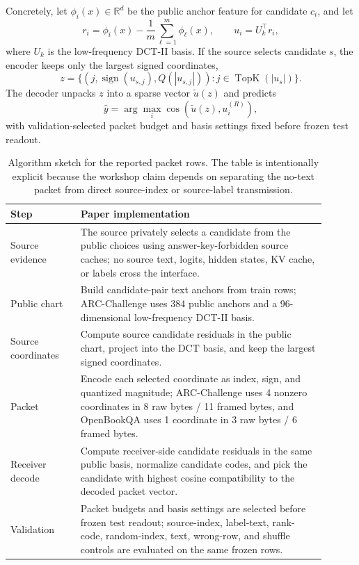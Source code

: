 \documentclass{article}
\newcommand{\arc}{ARC-Challenge}
\newcommand{\obqa}{OpenBookQA}
\begin{document}
Concretely, let $\phi_i(x)\in\mathbb{R}^{d}$ be the public anchor feature for candidate $c_i$, and let
\[
r_i=\phi_i(x)-\frac{1}{m}\sum_{\ell=1}^{m}\phi_\ell(x), \qquad u_i = U_k^\top r_i ,
\]
where $U_k$ is the low-frequency DCT-II basis. If the source selects candidate $s$, the encoder keeps only the largest signed coordinates,
\[
z=\{(j,\operatorname{sign}(u_{s,j}),Q(|u_{s,j}|)) : j\in \operatorname{TopK}(|u_s|)\}.
\]
The decoder unpacks $z$ into a sparse vector $\tilde u(z)$ and predicts
\[
\hat y=\arg\max_i \cos\!\left(\tilde u(z), u_i^{(R)}\right),
\]
with validation-selected packet budget and basis settings fixed before frozen test readout.

\begin{table}[t]
  \centering
  \scriptsize
  \setlength{\tabcolsep}{4pt}
  \begin{tabular}{p{0.20\linewidth}p{0.70\linewidth}}
    \toprule
    Step & Paper implementation \\
    \midrule
    Source evidence & The source privately selects a candidate from the public choices using answer-key-forbidden source caches; no source text, logits, hidden states, KV cache, or labels cross the interface. \\
    Public chart & Build candidate-pair text anchors from train rows; \arc{} uses 384 public anchors and a 96-dimensional low-frequency DCT-II basis. \\
    Source coordinates & Compute source candidate residuals in the public chart, project into the DCT basis, and keep the largest signed coordinates. \\
    Packet & Encode each selected coordinate as index, sign, and quantized magnitude; \arc{} uses 4 nonzero coordinates in 8 raw bytes / 11 framed bytes, and \obqa{} uses 1 coordinate in 3 raw bytes / 6 framed bytes. \\
    Receiver decode & Compute receiver-side candidate residuals in the same public basis, normalize candidate codes, and pick the candidate with highest cosine compatibility to the decoded packet vector. \\
    Validation & Packet budgets and basis settings are selected before frozen test readout; source-index, label-text, rank-code, random-index, text, wrong-row, and shuffle controls are evaluated on the same frozen rows. \\
    \bottomrule
  \end{tabular}
  \caption{Algorithm sketch for the reported packet rows. The table is intentionally explicit because the workshop claim depends on separating the no-text packet from direct source-index or source-label transmission.}
  \label{tab:algorithm}
\end{table}
\end{document}

